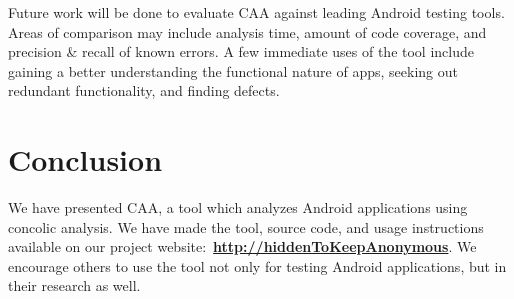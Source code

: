 \documentclass{sig-alternate}
\newif\ifisnopii
\begin{document}


Future work will be done to evaluate CAA against leading Android testing tools. Areas of comparison may include analysis time, amount of code coverage, and precision \& recall of known errors. A few immediate uses of the tool include gaining a better understanding the functional nature of apps, seeking out redundant functionality, and finding defects.



\section{Conclusion}
\label{sec: conclusion}

We have presented CAA, a tool which analyzes Android applications using concolic analysis. We have made the tool, source code, and usage instructions available on our project website:~\textbf{\ifisnopii \url{http://darwin.rit.edu/caa/}\else \url{http://hiddenToKeepAnonymous}\fi}. We encourage others to use the tool not only for testing Android applications, but in their research as well.






\balance



\end{document}
